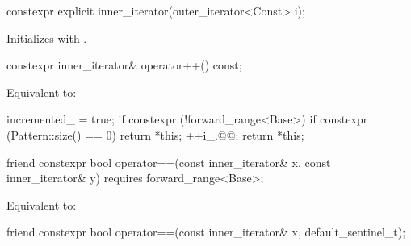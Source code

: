 \documentclass{wg21}
\begin{document}
%
\begin{itemdecl}
constexpr explicit inner_iterator(outer_iterator<Const> i);
\end{itemdecl}

\begin{itemdescr}
\pnum
\effects Initializes  with .
\end{itemdescr}

%
\begin{itemdecl}
constexpr inner_iterator& operator++() const;
\end{itemdecl}

\begin{itemdescr}
\pnum
\effects Equivalent to:
\begin{codeblock}
	incremented_ = true;
	if constexpr (!forward_range<Base>) {
		if constexpr (Pattern::size() == 0) {
			return *this;
		}
	}
	++i_.@@;
	return *this;
\end{codeblock}
\end{itemdescr}

%
\begin{itemdecl}
friend constexpr bool operator==(const inner_iterator& x, const inner_iterator& y)
requires forward_range<Base>;
\end{itemdecl}

\begin{itemdescr}
\pnum
\effects Equivalent to: 
\end{itemdescr}

%
\begin{itemdecl}
friend constexpr bool operator==(const inner_iterator& x, default_sentinel_t);
\end{itemdecl}
\end{document}
